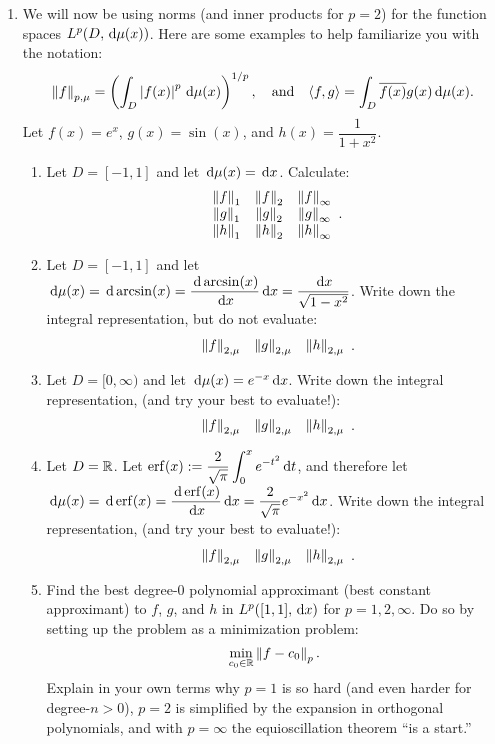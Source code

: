 \documentclass[11pt,letterpaper]{article}
\begin{document}
\begin{enumerate}
\item We will now be using norms (and inner products for $p=2$) for the function spaces $L^p(D,{\rm\,d}\mu(x))$. Here are some examples to help familiarize you with the notation:
\[
\left\|{f}\right\|_{p,\mu} = \left(\int_D \left|{f(x)}\right|^p{\rm\,d}\mu(x)\right)^{1/p},\quad{\rm and}\quad\langle f,g\rangle = \int_D \overline{f(x)}g(x){\rm\,d}\mu(x).
\]
 Let $f(x) = e^x$, $g(x) = \sin(x)$, and $h(x) = \dfrac{1}{1+x^2}$.
\begin{enumerate}
\item Let $D = [-1,1]$ and let ${\rm\,d}\mu(x) = {\rm\,d} x$. Calculate:
\[\begin{array}{ccc}
\left\|{f}\right\|_1 & \left\|{f}\right\|_2 & \left\|{f}\right\|_\infty\\
\left\|{g}\right\|_1 & \left\|{g}\right\|_2 & \left\|{g}\right\|_\infty\\
\left\|{h}\right\|_1 & \left\|{h}\right\|_2 & \left\|{h}\right\|_\infty\\
\end{array}.
\]
\item Let $D=[-1,1]$ and let ${\rm\,d}\mu(x) = {\rm\,d}\arcsin(x) = \dfrac{{\rm\,d} \arcsin(x)}{{\rm\,d} x}{\rm\,d} x = \dfrac{{\rm\,d} x}{\sqrt{1-x^2}}$. Write down the integral representation, but do not evaluate:
\[
\begin{array}{ccc}
\left\|{f}\right\|_{2,\mu} & \left\|{g}\right\|_{2,\mu} & \left\|{h}\right\|_{2,\mu}\\
\end{array}.
\]
\item Let $D = [0,\infty)$ and let ${\rm\,d}\mu(x) = e^{-x}{\rm\,d} x$. Write down the integral representation, (and try your best to evaluate!):
\[
\begin{array}{ccc}
\left\|{f}\right\|_{2,\mu} & \left\|{g}\right\|_{2,\mu} & \left\|{h}\right\|_{2,\mu}\\
\end{array}.
\]
\item Let $D=\mathbb{R}$. Let $\displaystyle \operatorname{erf}(x) := \dfrac{2}{\sqrt{\pi}}\int_0^x e^{-t^2}{\rm\,d} t$, and therefore let ${\rm\,d}\mu(x) = {\rm\,d}\operatorname{erf}(x) = \dfrac{{\rm\,d} \operatorname{erf}(x)}{{\rm\,d} x}{\rm\,d} x = \dfrac{2}{\sqrt{\pi}}e^{-x^2}{\rm\,d} x$. Write down the integral representation, (and try your best to evaluate!):
\[
\begin{array}{ccc}
\left\|{f}\right\|_{2,\mu} & \left\|{g}\right\|_{2,\mu} & \left\|{h}\right\|_{2,\mu}\\
\end{array}.
\]
\item Find the best degree-$0$ polynomial approximant (best constant approximant) to $f$, $g$, and $h$ in $L^p([1,1],{\rm\,d} x)$ for $p=1,2,\infty$. Do so by setting up the problem as a minimization problem:
\[
\min_{c_0\in\mathbb{R}}\left\|{f-c_0}\right\|_p.
\]
Explain in your own terms why $p=1$ is so hard (and even harder for degree-$n>0$), $p=2$ is simplified by the expansion in orthogonal polynomials, and with $p=\infty$ the equioscillation theorem ``is a start.''
\end{enumerate}


\end{enumerate}
\end{document}
